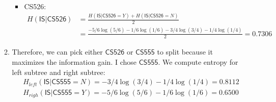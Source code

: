 \documentclass{article}
\begin{document}
\begin{enumerate}
\begin{enumerate}
\begin{itemize}
\begin{equation}
\begin{split}
             \end{split}
             \end{equation}
             \item CS526:
             \begin{equation}
             \begin{split}
             H(\mathsf{IS} | \mathsf{CS526}) &= \frac{H(\mathsf{IS} | \mathsf{CS526} = Y) + H(\mathsf{IS} | \mathsf{CS526} = N)}{2}
             \\&= \frac{-5/6\log(5/6) - 1/6\log(1/6) - 3/4\log(3/4)-1/4\log(1/4)}{2} = 0.7306
             \end{split}
             \end{equation}
         \end{itemize} 

         \item Therefore, we can pick either $\mathsf{CS526}$ or $\mathsf{CS555}$ to split because it maximizes the information gain. I chose $\mathsf{CS555}$.
         We compute entropy for left subtree and right subtree:
         \begin{equation}
             \begin{split}
                 &H_{left}(\mathsf{IS} |\mathsf{CS555} = N) = - 3/4\log(3/4)-1/4\log(1/4) = 0.8112\\
                 &H_{righ}(\mathsf{IS} |\mathsf{CS555} = Y) = -5/6\log(5/6) - 1/6\log(1/6) = 0.6500\\
             \end{split}
         \end{equation}



\end{enumerate}
\end{enumerate}
\end{document}
